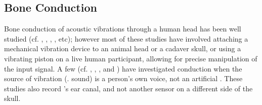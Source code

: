 \subsection{Bone Conduction}
Bone conduction of acoustic vibrations through a human head has been well studied (cf. \cite{allen:60}, \cite{hakansson:94}, \cite{stenfelt:00}, \cite{reinfeldt:10}, etc); however most of these studies have involved attaching a mechanical vibration device to an animal head or a cadaver skull, or using a vibrating piston on a live human participant, allowing for precise manipulation of the input signal.  
% 
%
A few (cf. \cite{bekesy:48}, \cite{hansen:97b}, \cite{porschmann:00}, and \cite{reinfeldt:10}) have investigated \DIFdelbegin {}\DIFdelend \DIFaddbegin {}\DIFaddend conduction when the source of vibration (\DIFdelbegin {}\DIFdelend \DIFaddbegin {}\DIFaddend . sound) is a person's own voice, not an artificial \DIFdelbegin {}\DIFdelend \DIFaddbegin {}\DIFaddend .  These studies also record \DIFdelbegin {}\DIFdelend \DIFaddbegin {}\DIFaddend 's ear canal, and not \DIFaddbegin {}\DIFaddend another sensor on a different side of the skull.

